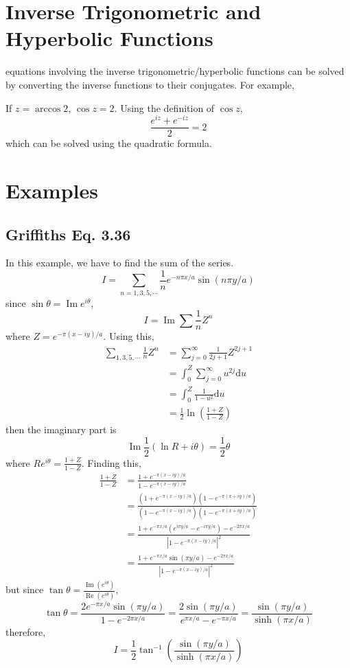 \documentclass[oneside]{book}
\numberwithin{equation}{chapter} %
\begin{document}
\section{Inverse Trigonometric and Hyperbolic Functions}
equations involving the inverse trigonometric/hyperbolic functions can be solved by converting the inverse functions to their conjugates. For example,

If $z=\arccos 2$, $\cos z =2$. Using the definition of $\cos z$, 
$$\frac{e^{iz}+e^{-iz}}2=2$$
which can be solved using the quadratic formula. 

\section{Examples}
\subsection{Griffiths Eq. 3.36}
In this example, we have to find the sum of the series.
$$I=\sum_{n=1,3,5,\cdots}\frac{1}{n}e^{-n\pi x/a}\sin(n\pi y/a)$$
since $\sin\theta=\operatorname{Im}e^{i\theta}$,
$$I=\operatorname{Im}\sum\frac 1nZ^n$$
where $Z=e^{-\pi(x-iy)/a}$. Using this,
\begin{align*}
	\sum_{1,3,5,\cdots}\frac 1nZ^n&=\sum^\infty_{j=0}\frac 1{2j+1}Z^{2j+1}\\
	&=\int^Z_0\sum^\infty_{j=0}u^{2j}\mathrm du\\
	&=\int^Z_0\frac 1{1-u^2}\mathrm du\\
	&=\frac 12\ln\left(\frac{1+Z}{1-Z}\right)
\end{align*}
then the imaginary part is 
$$\operatorname{Im}\frac 12 (\ln R+i\theta)=\frac 12\theta$$
where $Re^{i\theta}=\frac{1+Z}{1-Z}$. Finding this,
\begin{align*}
	\frac{1+Z}{1-Z}&=\frac{1+e^{-\pi(x-iy)/a}}{1-e^{-\pi(x-iy)/a}}\\
	&=\frac{(1+e^{-\pi(x-iy)/a})(1-e^{-\pi(x+iy)/a})}{(1-e^{-\pi(x-iy)/a})(1-e^{-\pi(x+iy)/a})}\\
	&=\frac{1+e^{-\pi x/a}(e^{i\pi y/a}-e^{-i\pi y/a})-e^{-2\pi x/a}}{|1-e^{-\pi(x-iy)/a}|^2}\\
	&=\frac{1+e^{-\pi x/a}\sin(\pi y/a)-e^{-2\pi x/a}}{|1-e^{-\pi(x-iy)/a}|^2}
\end{align*}
but since $\tan\theta=\frac{\operatorname{Im}(e^{i\theta})}{\operatorname{Re}(e^{i\theta})}$,
$$\tan\theta=\frac{2e^{-\pi x/a}\sin(\pi y/a)}{1-e^{-2\pi x/a}}=\frac{2\sin(\pi y/a)}{e^{\pi x/a}-e^{-\pi x/a}}=\frac{\sin(\pi y/a)}{\sinh(\pi x/a)}$$
therefore,
$$I=\frac{1}{2}\tan^{-1}\left(\frac{\sin(\pi y/a)}{\sinh(\pi x/a)}\right)$$
\clearpage
\end{document}
